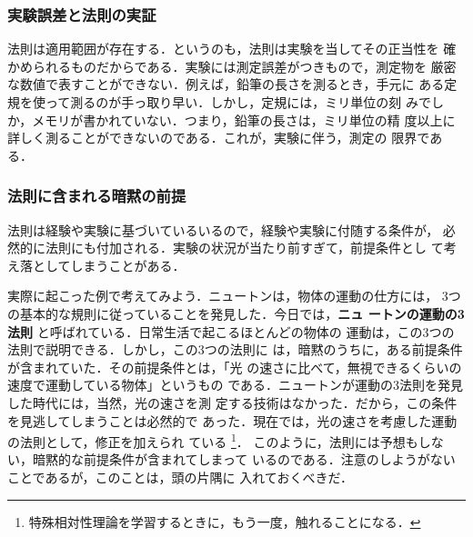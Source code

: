             \subsubsection{実験誤差と法則の実証}
            法則は適用範囲が存在する．というのも，法則は実験を当してその正当性を
            確かめられるものだからである．実験には測定誤差がつきもので，測定物を
            厳密な数値で表すことができない．例えば，鉛筆の長さを測るとき，手元に
            ある定規を使って測るのが手っ取り早い．しかし，定規には，ミリ単位の刻
            みでしか，メモリが書かれていない．つまり，鉛筆の長さは，ミリ単位の精
            度以上に詳しく測ることができないのである．これが，実験に伴う，測定の
            限界である．


            \subsubsection{法則に含まれる暗黙の前提}
            法則は経験や実験に基づいているいるので，経験や実験に付随する条件が，
            必然的に法則にも付加される．実験の状況が当たり前すぎて，前提条件とし
            て考え落としてしまうことがある．

            実際に起こった例で考えてみよう．ニュートンは，物体の運動の仕方には，
            3つの基本的な規則に従っていることを発見した．今日では，\textbf{ニュ
            ートンの運動の3法則} と呼ばれている．日常生活で起こるほとんどの物体の
            運動は，この3つの法則で説明できる．しかし，この3つの法則に
            は，暗黙のうちに，ある前提条件が含まれていた．その前提条件とは，「光
            の速さに比べて，無視できるくらいの速度で運動している物体」というもの
            である．ニュートンが運動の3法則を発見した時代には，当然，光の速さを測
            定する技術はなかった．だから，この条件を見逃してしまうことは必然的で
            あった．現在では，光の速さを考慮した運動の法則として，修正を加えられ
            ている
                \footnote{
                    特殊相対性理論を学習するときに，もう一度，触れることになる．
                }．
            このように，法則には予想もしない，暗黙的な前提条件が含まれてしまって
            いるのである．注意のしようがないことであるが，このことは，頭の片隅に
            入れておくべきだ．

